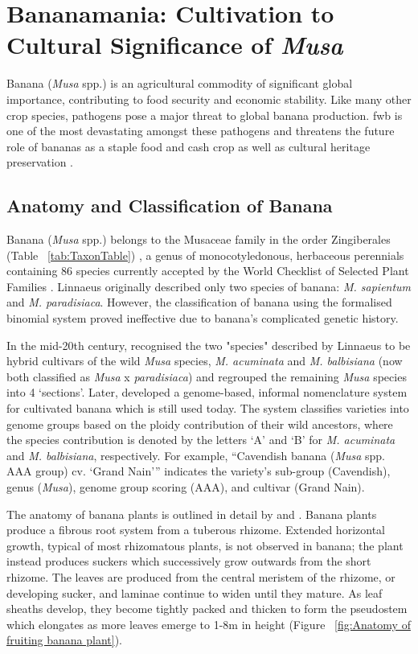 \section{Bananamania: Cultivation to Cultural Significance of \textit{Musa}}

Banana (\textit{Musa} spp.) is an agricultural commodity of significant global importance, contributing to food security and economic stability. Like many other crop species, pathogens pose a major threat to global banana production. \acf{fwb} is one of the most devastating amongst these pathogens and threatens the future role of bananas as a staple food and cash crop as well as cultural heritage preservation \parencite{Kema2021}. 

\subsection{Anatomy and Classification of Banana}  

Banana (\textit{Musa} spp.) belongs to the Musaceae family in the order Zingiberales (Table ~\ref{tab:TaxonTable}) \parencite{Schoch2020}, a genus of monocotyledonous, herbaceous perennials containing 86 species currently accepted by the World Checklist of Selected Plant Families \parencite{WCSPF2023}. Linnaeus originally described only two species of banana: \textit{M. sapientum }and \textit{M. paradisiaca}. However, the classification of banana using the formalised binomial system proved ineffective due to banana’s complicated genetic history.

In the mid-20th century, \textcite{Cheesman1947} recognised the two "species" described by Linnaeus to be hybrid cultivars of the wild \textit{Musa} species, \textit{M. acuminata} and \textit{M. balbisiana} (now both classified as \textit{Musa} x \textit{paradisiaca}) and regrouped the remaining \textit{Musa} species into 4 ‘sections’. Later, \textcite{Simmonds1955} developed a genome-based, informal nomenclature system for cultivated banana which is still used today. The system classifies varieties into genome groups based on the ploidy contribution of their wild ancestors, where the species contribution is denoted by the letters ‘A’ and ‘B’ for \textit{M. acuminata} and \textit{M. balbisiana}, respectively. For example, “Cavendish banana (\textit{Musa } spp. AAA group) cv. ‘Grand Nain’” indicates the variety’s sub-group (Cavendish), genus (\textit{Musa}), genome group scoring (AAA), and cultivar (Grand Nain).

The anatomy of banana plants is outlined in detail by \textcite{Bakry2009} and \textcite{Robinson2010}. Banana plants produce a fibrous root system from a tuberous rhizome. Extended horizontal growth, typical of most rhizomatous plants, is not observed in banana; the plant instead produces suckers which successively grow outwards from the short rhizome. The leaves are produced from the central meristem of the rhizome, or developing sucker, and laminae continue to widen until they mature. As leaf sheaths develop, they become tightly packed and thicken to form the pseudostem which elongates as more leaves emerge to 1-8m in height (Figure ~\ref{fig:Anatomy of fruiting banana plant}). 

